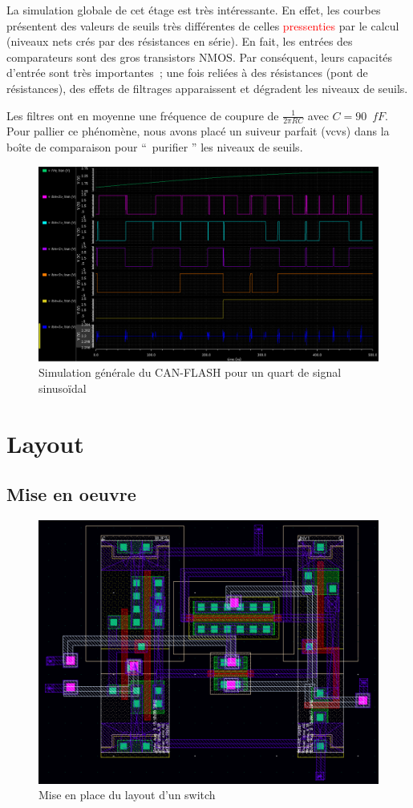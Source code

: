 \documentclass[11pt]{article}
\begin{document}
La simulation globale de cet \'etage est tr\`es int\'eressante. En effet, les courbes pr\'esentent des valeurs de
seuils tr\`es diff\'erentes de celles \textcolor{red}{pressenties} par le calcul (niveaux nets cr\'es par des r\'esistances en s\'erie).
En fait, les entr\'ees des comparateurs sont des gros transistors NMOS. Par cons\'equent, leurs capacit\'es d'entr\'ee
sont tr\`es importantes ; une fois reli\'ees \`a des r\'esistances (pont de r\'esistances), des effets de filtrages
apparaissent et d\'egradent les niveaux de seuils.

Les filtres ont en moyenne une fr\'equence de coupure de $\frac{1}{2 \pi R C}$ avec $C  = 90 \phantom{2} fF.$
Pour pallier ce ph\'enom\`ene, nous avons plac\'e un suiveur parfait (vcvs) dans la bo\^ite de comparaison pour
`` purifier '' les niveaux de seuils.

\begin{figure}[!htb]
      \centering
      \includegraphics[width=\linewidth]{sim_general.png}
      \caption{Simulation g\'en\'erale du CAN-FLASH pour un quart de signal sinuso\"idal}
      \label{fig:schsimgenerale}
\end{figure}%

\clearpage

\section{Layout}
\subsection{Mise en oeuvre}

\begin{figure}[!htb]
      \centering
      \includegraphics[width=0.6\linewidth]{layout_.png}
      \caption{Mise en place du layout d'un switch}
\end{figure}%
\end{document}
